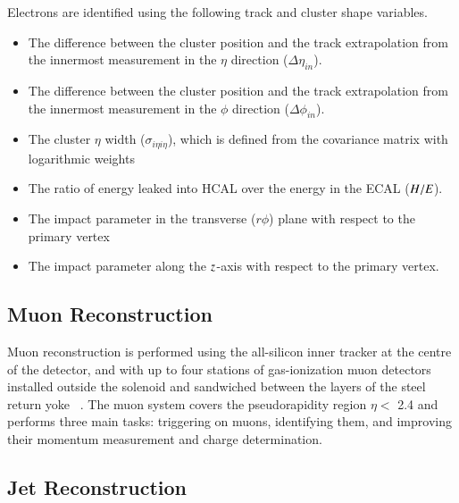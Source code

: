 Electrons are identified using  the following track and cluster shape variables.
\begin{itemize}

\item The difference between the cluster position and the track extrapolation from the innermost measurement in the $\eta$ direction ($\Delta \eta_{in}$). \vspace{-0.2in}

\item The difference between the cluster position and the track extrapolation from the innermost measurement in the  $\phi$ direction ($\Delta \phi_{in}$). \vspace{-0.2in}

\item The cluster $\eta$ width ($\sigma_{i\eta i\eta}$), which is defined from the covariance matrix with logarithmic weights \vspace{-0.2in}

\item  The ratio of energy leaked into HCAL over the energy in the ECAL ($\it H/E$).\vspace{-0.2in}

\item The impact parameter in the transverse ($r\phi$) plane with respect to the primary vertex \vspace{-0.2in}

\item The impact parameter along the $\it z$-axis with respect to the primary vertex. 

\end{itemize}




\subsection{Muon Reconstruction}
Muon reconstruction is performed using the all-silicon inner tracker at the centre of the detector, and with up to four stations of gas-ionization muon detectors installed outside the solenoid and sandwiched between the layers of the steel return yoke ~\cite{MuonReco}. The muon system covers the pseudorapidity region $\eta < $ 2.4 and performs three main tasks: triggering on muons, identifying them, and improving their momentum measurement and charge determination.


\subsection{Jet Reconstruction}

